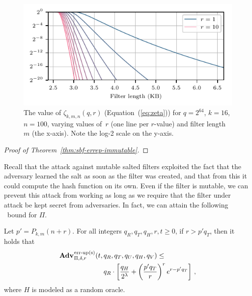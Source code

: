 \begin{figure}
  \hspace*{-10pt}
  \includegraphics{fig/bf-bound}
  \vspace{-24pt}
  \caption{
    The value of $\zeta_{k,m,n}(q,r)$ (Equation~(\ref{eq:zeta})) for $q=2^{64}$,
    $k=16$, $n=100$, varying values of~$r$ (one line per $r$-value) and filter
    length~$m$ (the x-axis).  Note the log-2 scale on the y-axis.
  }
  \label{fig:bf-bound}
\end{figure}

\begin{proof}[Proof of Theorem~\ref{thm:sbf-errep-immutable}]
  
\end{proof}


Recall that the attack against mutable salted filters exploited the fact that
the adversary learned the salt as soon as the filter was created, and that from
this it could compute the hash function on its own. Even if the filter is
mutable, we can prevent this attack from working as long as we require that the
filter under attack be kept secret from adversaries. In fact, we can attain the
following \erreps\ bound for $\Pi$.

\begin{theorem}\label{thm:sbf-erreps}
  Let $p' = P_{k,m}(n+r)$.
  For all integers $q_R, q_T, q_H, r, t \geq 0$, if
  $r > p'q_T$, then it holds that
  \begin{eqnarray*}
    \begin{aligned}
      \Adv{\erreps}_{\Pi,\delta,r}(t,\,&q_R, q_T, q_U, q_H, q_V) \leq \\
          & q_R \cdot \left[
      \frac{q_H}{2^\lambda} +
      \left(\frac{p'q_T}{r}\right)^re^{r-p'q_T}\right]\,,
    \end{aligned}
\end{eqnarray*}
  where $H$ is modeled as a random oracle.
\end{theorem}

